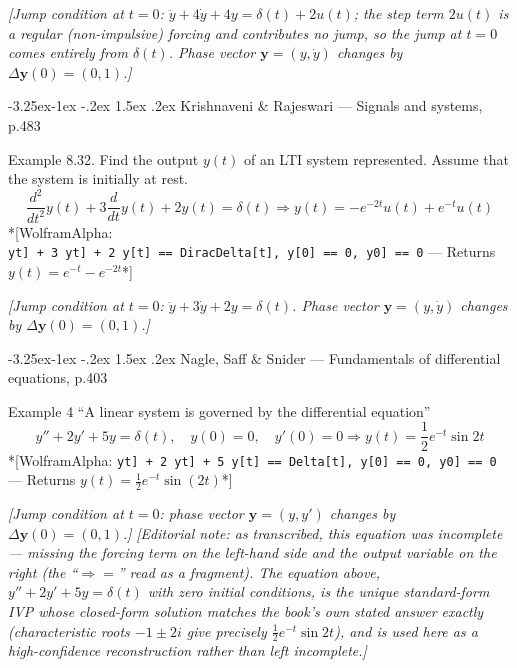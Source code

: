 \documentclass[
  11pt,
]{article}
\makeatletter
\providecommand{\implies}{\Longrightarrow}
\renewcommand\paragraph{\@startsection{paragraph}{4}{\z@}%
                                     {-3.25ex\@plus -1ex \@minus -.2ex}%
                                     {1.5ex \@plus .2ex}%
                                     {\normalfont\normalsize\bfseries}}
\makeatother
\begin{document}
\emph{{[}Jump condition at \(t=0\):
\(\ddot y+4\dot y+4y=\delta(t)+2u(t)\); the step term \(2u(t)\) is a
regular (non-impulsive) forcing and contributes no jump, so the jump at
\(t=0\) comes entirely from \(\delta(t)\). Phase vector
\(\mathbf y=(y,\dot y)\) changes by \(\Delta\mathbf y(0)=(0,1)\).{]}}

\hypertarget{krishnaveni-rajeswari-signals-and-systems-p.483}{%
\paragraph{Krishnaveni \& Rajeswari --- Signals and systems,
p.483}\label{krishnaveni-rajeswari-signals-and-systems-p.483}}

Example 8.32. Find the output \(y(t)\) of an LTI system represented.
Assume that the system is initially at rest. \[
\frac{d^2}{dt^2}y(t) + 3\frac{d}{dt}y(t) + 2y(t) = \delta(t) \implies y(t) = -e^{-2t}u(t) + e^{-t}u(t)
\] *{[}WolframAlpha:
\texttt{y\textquotesingle{}\textquotesingle{}{[}t{]}\ +\ 3\ y\textquotesingle{}{[}t{]}\ +\ 2\ y{[}t{]}\ ==\ DiracDelta{[}t{]},\ y{[}0{]}\ ==\ 0,\ y\textquotesingle{}{[}0{]}\ ==\ 0}
--- Returns \(y(t) = e^{-t} - e^{-2t}\)*{]}

\emph{{[}Jump condition at \(t=0\): \(\ddot y+3\dot y+2y=\delta(t)\).
Phase vector \(\mathbf y=(y,\dot y)\) changes by
\(\Delta\mathbf y(0)=(0,1)\).{]}}

\hypertarget{nagle-saff-snider-fundamentals-of-differential-equations-p.403}{%
\paragraph{Nagle, Saff \& Snider --- Fundamentals of differential
equations,
p.403}\label{nagle-saff-snider-fundamentals-of-differential-equations-p.403}}

Example 4 ``A linear system is governed by the differential equation''
\[
y'' + 2y' + 5y = \delta(t), \quad y(0) = 0, \quad y'(0) = 0 \implies y(t) = \frac{1}{2} e^{-t} \sin 2t
\] *{[}WolframAlpha:
\texttt{y\textquotesingle{}\textquotesingle{}{[}t{]}\ +\ 2\ y\textquotesingle{}{[}t{]}\ +\ 5\ y{[}t{]}\ ==\ Delta{[}t{]},\ y{[}0{]}\ ==\ 0,\ y\textquotesingle{}{[}0{]}\ ==\ 0}
--- Returns \(y(t) = \frac{1}{2} e^{-t} \sin(2t)\)*{]}

\emph{{[}Jump condition at \(t=0\): phase vector \(\mathbf y=(y,y')\)
changes by \(\Delta\mathbf y(0)=(0,1)\).{]}} \emph{{[}Editorial note: as
transcribed, this equation was incomplete --- missing the forcing term
on the left-hand side and the output variable on the right (the
``\(\implies =\)'' read as a fragment). The equation above,
\(y''+2y'+5y=\delta(t)\) with zero initial conditions, is the unique
standard-form IVP whose closed-form solution matches the book's own
stated answer exactly (characteristic roots \(-1\pm2i\) give precisely
\(\frac{1}{2}e^{-t}\sin2t\)), and is used here as a high-confidence
reconstruction rather than left incomplete.{]}}
\end{document}
